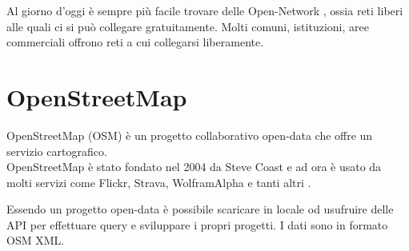 \documentclass[12pt,a4paper,openright,twoside]{report}
\begin{document}
Al giorno d'oggi è sempre più facile trovare delle Open-Network \cite{K11}, ossia reti liberi alle quali ci si può collegare gratuitamente. Molti comuni, istituzioni, aree commerciali offrono reti a cui collegarsi liberamente.



\section{OpenStreetMap}
OpenStreetMap (OSM) \cite{K12} è un progetto collaborativo open-data che offre un servizio cartografico.\\
OpenStreetMap è stato fondato nel 2004 da Steve Coast e ad ora è usato da molti servizi come Flickr, Strava, WolframAlpha e tanti altri \cite{K13}.

Essendo un progetto open-data è possibile scaricare in locale od usufruire delle API per effettuare query e sviluppare i propri progetti. I dati sono in formato OSM XML.
\end{document}
